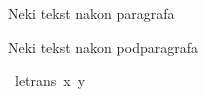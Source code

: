 \begin{isabellebody}
\begin{isamarkuptext}
\end{isamarkuptext}\isamarkuptrue%
%
\isadelimdocument
%
\endisadelimdocument
%
\isatagdocument
%
\isamarkuptrue%
%
\endisatagdocument
{\isafolddocument}%
%
\isadelimdocument
%
\endisadelimdocument
%
\begin{isamarkuptext}%
Neki tekst nakon paragrafa%
\end{isamarkuptext}\isamarkuptrue%
%
\isadelimdocument
%
\endisadelimdocument
%
\isatagdocument
%
\isamarkuptrue%
%
\endisatagdocument
{\isafolddocument}%
%
\isadelimdocument
%
\endisadelimdocument
%
\begin{isamarkuptxt}%
Neki tekst nakon podparagrafa%
\end{isamarkuptxt}\isamarkuptrue%
\isamarkupfalse%
\ {\isachardoublequoteopen}le{\isacharunderscore}{\kern0pt}trans\ x\ y{\isachardoublequoteclose}\isanewline
%
\isadelimproof
\ \ \ \ %
\endisadelimproof
%
\isatagproof
{}\isamarkupfalse%
\isanewline
%
\endisatagproof
{\isafoldproof}%
%
\isadelimproof
%
\endisadelimproof
%
\isadelimtheory
%
\endisadelimtheory
%
\isatagtheory
%
\endisatagtheory
{\isafoldtheory}%
%
\isadelimtheory
%
\endisadelimtheory
%
\end{isabellebody}%
\endinput
